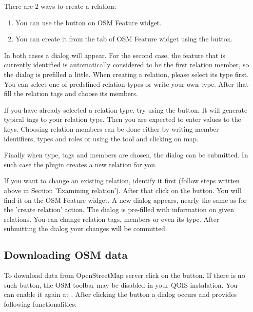 
There are 2 ways to create a relation:

\begin{enumerate}
\item You can use the 
button on OSM Feature widget.
\item You can create it from the  tab of OSM Feature widget
using the  button.
\end{enumerate}

In both cases a dialog will appear. For the second case, the feature that
is currently identified is automatically considered to be the first
relation member, so the dialog is prefilled a little. When creating
a relation, please select its type first. You can select one of
predefined relation types or write your own type. After that fill the
relation tags and choose its members.

If you have already selected a relation type, try using the
 button. It will generate typical
tags to your relation type. Then you are expected to enter values to the
keys. Choosing relation members can be done either by writing member
identifiers, types and roles or using the 
tool and clicking on map.

Finally when type, tags and members are chosen, the dialog can be submitted.
In such case the plugin creates a new relation for you.


If you want to change an existing relation, identify it first (follow steps
written above in Section 'Examining relation'). After that click on the
 button. You will find it
on the OSM Feature widget. A new dialog appears, nearly the same as for the
'create relation' action. The dialog is pre-filled with information on
given relations. You can change relation tags, members or even its type.
After submitting the dialog your changes will be committed.

\subsection{Downloading OSM data}

To download data from OpenStreetMap server click on the
 button. If there is no
such button, the OSM toolbar may be disabled in your QGIS instalation.
You can enable it again at  \arrow
{} \arrow {}. After clicking the
button a dialog occurs and provides following functionalities:

